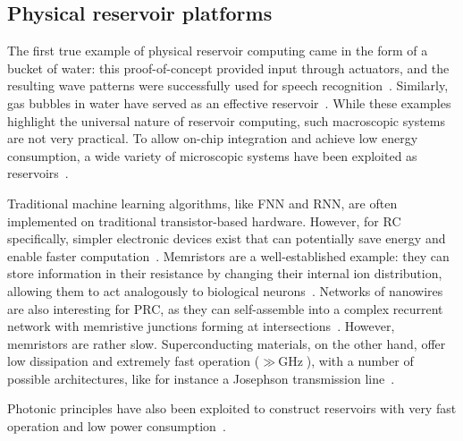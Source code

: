 \subsection{Physical reservoir platforms}\label{sec:1:PhysicalRCplatforms}
The first true example of physical reservoir computing came in the form of a bucket of water: this proof-of-concept provided input through actuators, and the resulting wave patterns were successfully used for speech recognition~\cite{PatternRecognition_Bucket}.
Similarly, gas bubbles in water have served as an effective reservoir~\cite{RC_GasBubbles}.
While these examples highlight the universal nature of reservoir computing, such macroscopic systems are not very practical.
To allow on-chip integration and achieve low energy consumption, a wide variety of microscopic systems have been exploited as reservoirs~\cite{RC_RecentAdvances}. \par
Traditional machine learning algorithms, like FNN and RNN, are often implemented on traditional transistor-based hardware.
However, for RC specifically, simpler electronic devices exist that can potentially save energy and enable faster computation~\cite{RC_RecentAdvances}.
Memristors are a well-established example: they can store information in their resistance by changing their internal ion distribution, allowing them to act analogously to biological neurons~\cite{MemristorArtificialNeuron,MemristiveNN,RC_DiffusiveMemristors,RC_MemristorTemporal}.
Networks of nanowires are also interesting for PRC, as they can self-assemble into a complex recurrent network with memristive junctions forming at intersections~\cite{RC_NNN}.
However, memristors are rather slow.
Superconducting materials, on the other hand, offer low dissipation and extremely fast operation ($\gg \SI{}{\giga\hertz}$), with a number of possible architectures, like for instance a Josephson transmission line~\cite{RC_SuperconductingElectronics}. \par %
Photonic principles have also been exploited to construct reservoirs with very fast operation and low power consumption~\cite{RC_RecentAdvances}.
